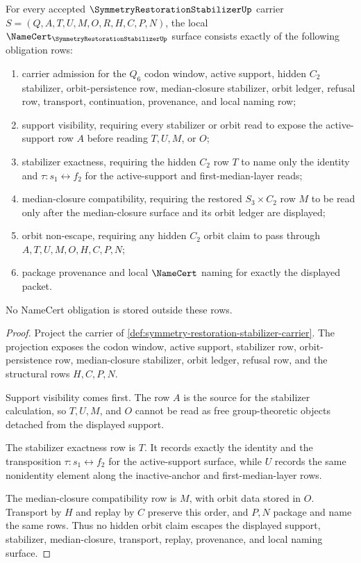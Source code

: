 \begin{theorem}
\label{thm:symmetry-restoration-stabilizer-namecert-obligations}
For every accepted $\SymmetryRestorationStabilizerUp$ carrier
$S=(Q,A,T,U,M,O,R,H,C,P,N)$, the local
$\NameCert_{\SymmetryRestorationStabilizerUp}$ surface consists exactly of
the following obligation rows:
\begin{enumerate}
\item carrier admission for the $Q_{6}$ codon window, active support,
hidden $C_{2}$ stabilizer, orbit-persistence row, median-closure stabilizer,
orbit ledger, refusal row, transport, continuation, provenance, and local
naming row;
\item support visibility, requiring every stabilizer or orbit read to expose
the active-support row $A$ before reading $T,U,M$, or $O$;
\item stabilizer exactness, requiring the hidden $C_{2}$ row $T$ to name only
the identity and $\tau:s_{1}\leftrightarrow f_{2}$ for the active-support
and first-median-layer reads;
\item median-closure compatibility, requiring the restored
$S_{3}\times C_{2}$ row $M$ to be read only after the median-closure surface
and its orbit ledger are displayed;
\item orbit non-escape, requiring any hidden $C_{2}$ orbit claim to pass
through $A,T,U,M,O,H,C,P,N$;
\item package provenance and local $\NameCert$ naming for exactly the
displayed packet.
\end{enumerate}
No NameCert obligation is stored outside these rows.
\end{theorem}
\begin{proof}
Project the carrier of
\autoref{def:symmetry-restoration-stabilizer-carrier}. The projection
exposes the codon window, active support, stabilizer row, orbit-persistence
row, median-closure stabilizer, orbit ledger, refusal row, and the structural
rows $H,C,P,N$.

Support visibility comes first. The row $A$ is the source for the stabilizer
calculation, so $T,U,M$, and $O$ cannot be read as free group-theoretic
objects detached from the displayed support.

The stabilizer exactness row is $T$. It records exactly the identity and the
transposition $\tau:s_{1}\leftrightarrow f_{2}$ for the active-support
surface, while $U$ records the same nonidentity element along the
inactive-anchor and first-median-layer rows.

The median-closure compatibility row is $M$, with orbit data stored in $O$.
Transport by $H$ and replay by $C$ preserve this order, and $P,N$ package and
name the same rows. Thus no hidden orbit claim escapes the displayed support,
stabilizer, median-closure, transport, replay, provenance, and local naming
surface.
\end{proof}

